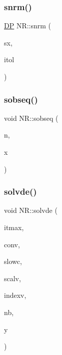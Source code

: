 \mbox{\label{namespaceNR_ad2b7cce8e123dc0d8dc69bf32a719f94}} 
\subsubsection{\texorpdfstring{snrm()}{snrm()}}
{\footnotesize\ttfamily \mbox{\hyperlink{namespaceNR_af6ff762dd605ff477b8e52387253a02a}{DP}} N\+R\+::snrm (\begin{DoxyParamCaption}\item[{\mbox{\hyperlink{namespaceNR_a9f943da53862537c552e2a770cb170ae}{Vec\+\_\+\+I\+\_\+\+DP}} \&}]{sx,  }\item[{const int}]{itol }\end{DoxyParamCaption})}

\mbox{\label{namespaceNR_a1357ef8a6e9ec8dd977c9280119cb41b}} 
\subsubsection{\texorpdfstring{sobseq()}{sobseq()}}
{\footnotesize\ttfamily void N\+R\+::sobseq (\begin{DoxyParamCaption}\item[{const int}]{n,  }\item[{\mbox{\hyperlink{namespaceNR_a970094d23441f8ef6a45282a7eb2103d}{Vec\+\_\+\+O\+\_\+\+DP}} \&}]{x }\end{DoxyParamCaption})}

\mbox{\label{namespaceNR_aed31ba4292a87797a7eef501659413d2}} 
\subsubsection{\texorpdfstring{solvde()}{solvde()}}
{\footnotesize\ttfamily void N\+R\+::solvde (\begin{DoxyParamCaption}\item[{const int}]{itmax,  }\item[{const \mbox{\hyperlink{namespaceNR_af6ff762dd605ff477b8e52387253a02a}{DP}}}]{conv,  }\item[{const \mbox{\hyperlink{namespaceNR_af6ff762dd605ff477b8e52387253a02a}{DP}}}]{slowc,  }\item[{\mbox{\hyperlink{namespaceNR_a9f943da53862537c552e2a770cb170ae}{Vec\+\_\+\+I\+\_\+\+DP}} \&}]{scalv,  }\item[{\mbox{\hyperlink{namespaceNR_ae67ce7dc86a8a64a7ce73c3c030ff610}{Vec\+\_\+\+I\+\_\+\+I\+NT}} \&}]{indexv,  }\item[{const int}]{nb,  }\item[{\mbox{\hyperlink{namespaceNR_ad1513aa4697878ed3bff0b8b3c9dd910}{Mat\+\_\+\+I\+O\+\_\+\+DP}} \&}]{y }\end{DoxyParamCaption})}

